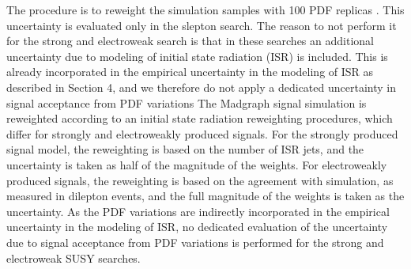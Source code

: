 \begin{itemize}
The procedure is to reweight the simulation samples with 100 PDF replicas \cite{Butterworth:2015oua}. This uncertainty is evaluated only in the slepton search. 
The reason to not perform it for the strong and electroweak search is that in these searches an additional uncertainty due to modeling of initial state radiation (ISR) is included. 
This is already incorporated in the empirical
uncertainty in the modeling of ISR as described in Section 4, and we therefore do not apply a
dedicated uncertainty in signal acceptance from PDF variations
The Madgraph signal simulation is reweighted according to an initial state radiation reweighting procedures, which differ for strongly and electroweakly produced signals. 
For the strongly produced signal model, the reweighting is based on the number of ISR jets, and the uncertainty is taken as half of the magnitude of the weights. 
For electroweakly produced signals, the reweighting is based on the \PZ \pt agreement with simulation, as measured in dilepton events, and the full magnitude of the weights is taken as the uncertainty. 
As the PDF variations are indirectly incorporated in the empirical uncertainty in the modeling of ISR, no dedicated evaluation of the uncertainty due to signal acceptance from PDF variations is performed for the strong and electroweak SUSY searches.
\end{itemize}
